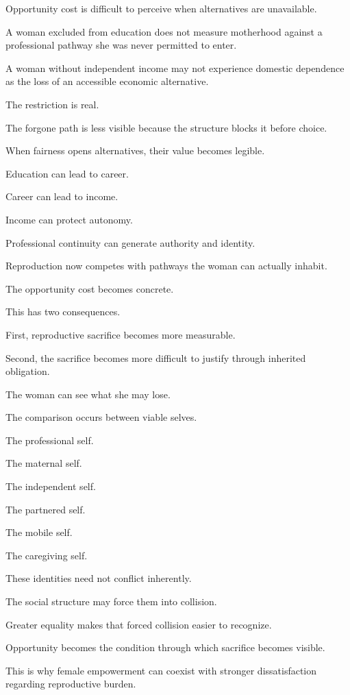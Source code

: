 Opportunity cost is difficult to perceive when alternatives are unavailable.

A woman excluded from education does not measure motherhood against a professional pathway she was never permitted to enter.

A woman without independent income may not experience domestic dependence as the loss of an accessible economic alternative.

The restriction is real.

The forgone path is less visible because the structure blocks it before choice.

When fairness opens alternatives, their value becomes legible.

Education can lead to career.

Career can lead to income.

Income can protect autonomy.

Professional continuity can generate authority and identity.

Reproduction now competes with pathways the woman can actually inhabit.

The opportunity cost becomes concrete.

This has two consequences.

First, reproductive sacrifice becomes more measurable.

Second, the sacrifice becomes more difficult to justify through inherited obligation.

The woman can see what she may lose.

The comparison occurs between viable selves.

The professional self.

The maternal self.

The independent self.

The partnered self.

The mobile self.

The caregiving self.

These identities need not conflict inherently.

The social structure may force them into collision.

Greater equality makes that forced collision easier to recognize.

Opportunity becomes the condition through which sacrifice becomes visible.

This is why female empowerment can coexist with stronger dissatisfaction regarding reproductive burden.

